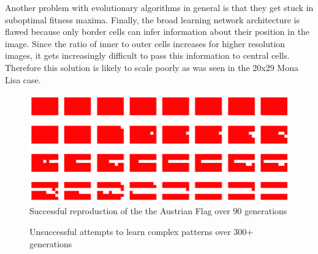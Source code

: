 Another problem with evolutionary algorithms in general is that they get stuck in suboptimal fitness maxima.
Finally, the broad learning network architecture is flawed because only border cells can infer information about their position in the image.
Since the ratio of inner to outer cells increases for higher resolution images, it gets increasingly difficult to pass this information to central cells.
Therefore this solution is likely to scale poorly as was seen in the 20x29 Mona Lisa case. \\

\begin{figure}[!h]
    \centering
    \includegraphics[width=5in]{images/austria-flag.png}
    \caption{Successful reproduction of the the Austrian Flag over 90 generations \cite{elmenreich2011evolving}}
    \label{fig:austria-flag}
\end{figure}

\begin{figure}[htp] 
    \centering
    \hfill%
    \caption{Unsuccessful attempts to learn complex patterns over 300+ generations}
\end{figure}


